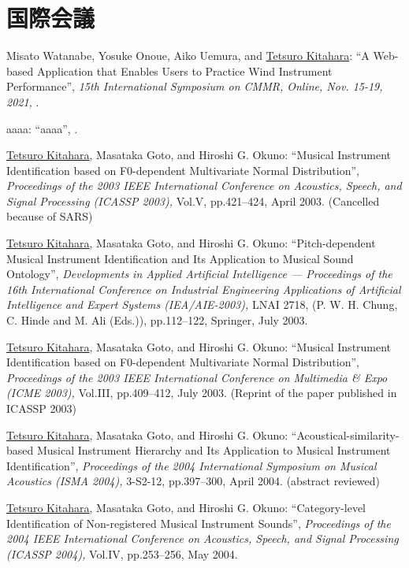 \section*{国際会議}
\begin{Enumerate}
  
\item 
Misato Watanabe, 
Yosuke Onoue, 
Aiko Uemura, 
and 
\underline{Tetsuro Kitahara}: 
    ``A Web-based Application that Enables Users to Practice Wind Instrument Performance'', 
    {\it 15th International Symposium on CMMR, Online, Nov. 15-19, 2021,
    } . 

\item 
aaaa: 
    ``aaaa'', 
    . 

\item 
\underline{Tetsuro Kitahara}, 
Masataka Goto, 
and 
Hiroshi
      G. Okuno: 
    ``Musical Instrument Identification based on F0-dependent Multivariate Normal Distribution'', 
    {\it Proceedings of
      the 2003 IEEE International Conference on Acoustics, Speech, and Signal Processing
          (ICASSP 2003),
        } Vol.V, pp.421--424, April 2003. 
(Cancelled because of SARS)
\item 
\underline{Tetsuro Kitahara}, 
Masataka Goto, 
and 
Hiroshi
      G. Okuno: 
    ``Pitch-dependent Musical Instrument Identification and Its Application to Musical Sound
      Ontology'', 
    {\it Developments in Applied Artificial Intelligence --- Proceedings of the 16th
      International Conference on Industrial Engineering Applications of Artificial Intelligence and
      Expert Systems (IEA/AIE-2003),
    } LNAI 2718, (P. W. H. Chung, C. Hinde and M. Ali (Eds.)), pp.112--122, Springer, July 2003. 

\item 
\underline{Tetsuro Kitahara}, 
Masataka Goto, 
and 
Hiroshi
      G. Okuno: 
    ``Musical Instrument Identification based on F0-dependent Multivariate Normal Distribution'', 
    {\it Proceedings of the 2003 IEEE International Conference
      on Multimedia \& Expo
          (ICME 2003),
        } Vol.III, pp.409--412, July 2003. 
(Reprint of the paper published in ICASSP 2003)
\item 
\underline{Tetsuro Kitahara}, 
Masataka Goto, 
and 
Hiroshi
      G. Okuno: 
    ``Acoustical-similarity-based Musical Instrument Hierarchy and Its Application to Musical
      Instrument Identification'', 
    {\it Proceedings of the 2004 International Symposium on
      Musical Acoustics
          (ISMA 2004),
        } 3-S2-12, pp.397--300, April 2004. 
(abstract reviewed)
\item 
\underline{Tetsuro Kitahara}, 
Masataka Goto, 
and 
Hiroshi
      G. Okuno: 
    ``Category-level Identification of Non-registered Musical Instrument Sounds'', 
    {\it Proceedings of
      the 2004 IEEE International Conference on Acoustics, Speech, and Signal Processing
          (ICASSP 2004),
        } Vol.IV, pp.253--256, May 2004. 


\end{Enumerate}
